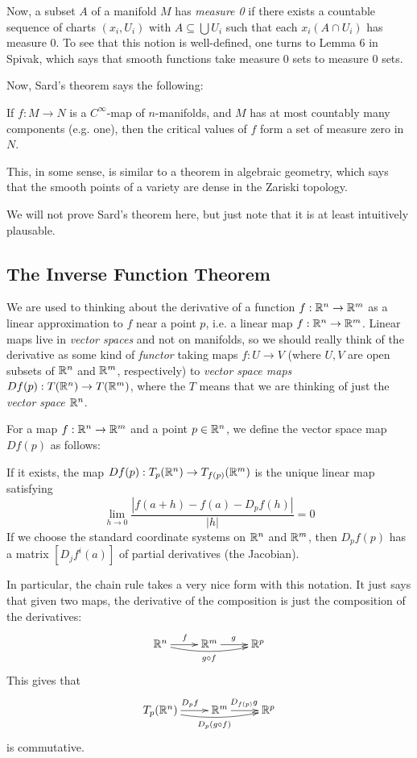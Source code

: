 \documentclass[11pt, english]{article}
\begin{document}
Now, a subset $A$  of a manifold $M$ has \emph{measure 0} if there exists a countable sequence of charts $(x_i, U_i)$  with $A \subseteq \bigcup U_i$ such that each $x_i(A \cap U_i)$ has measure $0$. To see that this notion is well-defined, one turns to Lemma 6 in Spivak, which says that smooth functions take measure 0 sets to measure 0 sets.

Now, Sard's theorem says the following:
\begin{thm}
If $f:M \to N$ is a $C^\infty$-map of $n$-manifolds, and $M$ has at most countably many components (e.g. one), then the critical values of $f$ form a set of measure zero in $N$.
\end{thm}

This, in some sense, is similar to a theorem in algebraic geometry, which says that the smooth points of a variety are dense in the Zariski topology.

We will not prove Sard's theorem here, but just note that it is at least intuitively plausable.


\subsection{The Inverse Function Theorem}

We are used to thinking about the derivative of a function $f:\mathbb{R}^n \to \mathbb{R}^m$ as a linear approximation to $f$ near a point $p$, i.e. a linear map $f:\mathbb{R}^n \to \mathbb{R}^m$. Linear maps live in \emph{vector spaces} and not on manifolds, so we should really think of the derivative as some kind of \emph{functor} taking maps $f:U \to V$ (where $U,V$ are open subsets of $\mathbb{R}^n$ and $\mathbb{R}^m$, respectively) to \emph{vector space maps} $Df(p):T(\mathbb{R}^n) \to T(\mathbb{R}^m)$, where the $T$ means that we are thinking of just the \emph{vector space} $\mathbb{R}^n$.

For a map $f:\mathbb{R} ^n \to \mathbb{R}^m$ and a point $p \in \mathbb{R}^n$, we define the vector space map $Df(p)$ as follows:
\begin{defi}
If it exists, the map $Df(p):T_p(\mathbb{R}^n) \to T_{f(p)}(\mathbb{R}^m)$ is the unique linear map satisfying
\[
\lim_{h \to 0} \frac{|f(a+h)-f(a)-D_pf(h)|}{|h|} = 0
\]
If we choose the standard coordinate systems on $\mathbb{R}^n$ and $\mathbb{R}^m$, then $D_pf(p)$ has a matrix $\left[ D_j f^i (a) \right]$ of partial derivatives (the Jacobian).
\end{defi}

In particular, the chain rule takes a very nice form with this notation. It just says that given two maps, the derivative of the composition is just the composition of the derivatives:
\[
\xymatrix{
\R^n \ar[r]^f \ar@/_/[rr]_{g \circ f} & \R^m \ar[r]^g & \R^p
}
\]
This gives that
\[
\xymatrix{
T_p(\R^n) \ar[r]^{D_pf} \ar@/_/[rr]_{D_p(g \circ f)} & \R^m \ar[r]^{D_{f(p)}g} & \R^p
}
\]
is commutative.
\end{document}

